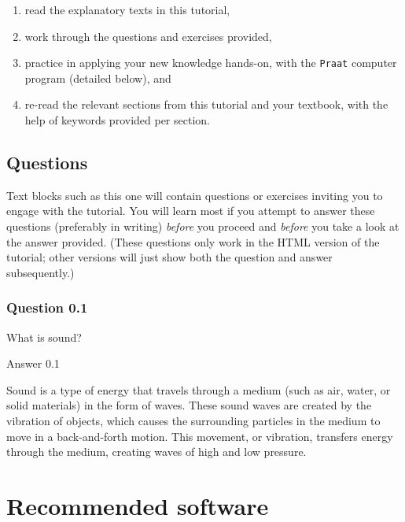 \documentclass[
]{book}
\providecommand{\tightlist}{%
  \setlength{\itemsep}{0pt}\setlength{\parskip}{0pt}}
\begin{document}
\begin{enumerate}
\def\labelenumi{(\arabic{enumi})}
\tightlist
\item
  read the explanatory texts in this tutorial,
\item
  work through the questions and exercises provided,
\item
  practice in applying your new knowledge hands-on, with the \texttt{Praat} computer program (detailed below), and
\item
  re-read the relevant sections from this tutorial and your textbook, with the help of keywords provided per section.
\end{enumerate}

\protect{}\label{question-intro}
\subsection*{Questions}\label{questions}

Text blocks such as this one will contain questions or exercises inviting you to engage with the tutorial. You will learn most if you attempt to answer these questions (preferably in writing) \emph{before} you proceed and \emph{before} you take a look at the answer provided. (These questions only work in the HTML version of the tutorial; other versions will just show both the question and answer subsequently.)

\subsubsection*{Question 0.1}\label{question-0.1}

What is sound?

Answer 0.1

Sound is a type of energy that travels through a medium (such as air, water, or solid materials) in the form of waves. These sound waves are created by the vibration of objects, which causes the surrounding particles in the medium to move in a back-and-forth motion. This movement, or vibration, transfers energy through the medium, creating waves of high and low pressure.

\section*{Recommended software}\label{recommended-software}
\end{document}
